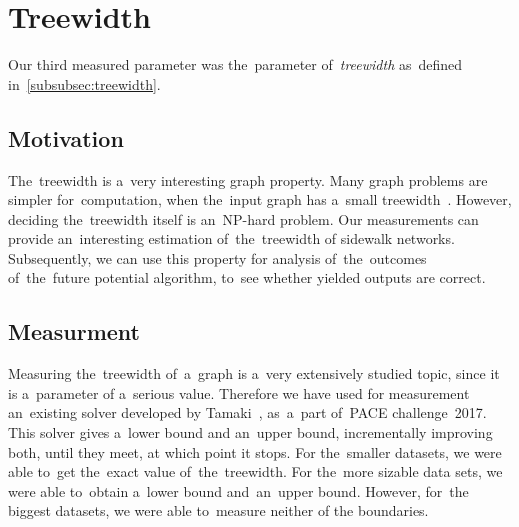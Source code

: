 \section{Treewidth}
\label{sec:Treewidth}
Our third measured parameter was the~parameter of~\textit{treewidth} as~defined in~\autoref{subsubsec:treewidth}.
\subsection{Motivation}
The~treewidth is a~very interesting graph property. Many graph problems are simpler for~computation, when the~input graph has a~small treewidth~\cite{Diestel}. However, deciding the~treewidth itself is an~NP-hard problem. Our measurements can provide an~interesting estimation of~the~treewidth of sidewalk networks. \\
Subsequently, we can use this property for analysis of~the~outcomes of~the~future potential algorithm, to~see whether yielded outputs are correct.
\subsection{Measurment}
Measuring the~treewidth of~a~graph is a~very extensively studied topic, since it is a~parameter of a~serious value. Therefore we have used for measurement an~existing solver developed by Tamaki~\cite{Tamaki1, Tamaki2, Tamaki3}, as~a~part of~PACE challenge~2017. \\
This solver gives a~lower bound and an~upper bound, incrementally improving both, until they meet, at which point it stops. For the~smaller datasets, we were able to~get the~exact value of~the~treewidth. For the~more sizable data sets, we were able to~obtain a~lower bound and~an~upper bound. However, for~the biggest datasets, we were able to~measure neither of the boundaries.
